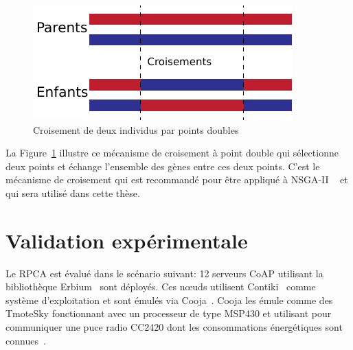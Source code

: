 \begin{figure}[ht]
  \centering
  \includegraphics[scale=1]{img/crossover.pdf}
  \caption{Croisement de deux individus par points doubles}
  \label{cache:fig:crossover}
\end{figure}

La Figure~\ref{cache:fig:crossover} illustre ce mécanisme de croisement à point double qui sélectionne deux points et échange l'ensemble des gènes entre ces deux points.
C'est le mécanisme de croisement qui est recommandé pour être appliqué à NSGA-II ~\cite{Luke2013Metaheuristics} et qui sera utilisé dans cette thèse.

\section{Validation expérimentale}
\label{cache:validation}

Le \ac{RPCA} est évalué dans le scénario suivant: 12 serveurs \ac{CoAP} utilisant la bibliothèque Erbium~\cite{kovatsch2011low} sont déployés.
Ces nœuds utilisent Contiki~\cite{dunkels2004contiki} comme système d'exploitation et sont émulés via Cooja~\cite{cooja}.
Cooja les émule comme des TmoteSky fonctionnant avec un processeur de type MSP430 et utilisant pour communiquer une puce radio CC2420 dont les consommations énergétiques sont connues~\cite{Polastre05}.

